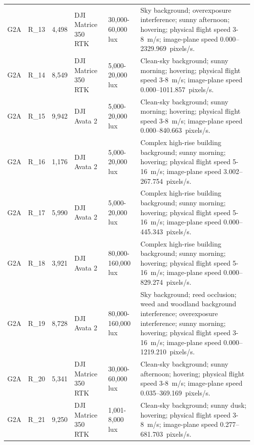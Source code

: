 \begin{longtable}{@{}C{0.045\textwidth} C{0.083\textwidth} C{0.075\textwidth} C{0.13\textwidth} C{0.15\textwidth} L{0.48\textwidth}@{}}
G2A & R\_13 & 4,498 & DJI Matrice 350 RTK & 30,000-60,000 lux & Sky background; overexposure interference; sunny afternoon; hovering; physical flight speed 3-8~m/s; image-plane speed 0.000--2329.969~pixels/s. \\

G2A & R\_14 & 8,549 & DJI Matrice 350 RTK & 5,000-20,000 lux & Clean-sky background; sunny morning; hovering; physical flight speed 3-8~m/s; image-plane speed 0.000--1011.857~pixels/s. \\

G2A & R\_15 & 9,942 & DJI Avata 2 & 5,000-20,000 lux & Clean-sky background; sunny morning; hovering; physical flight speed 3-8~m/s; image-plane speed 0.000--840.663~pixels/s. \\

G2A & R\_16 & 1,176 & DJI Avata 2 & 5,000-20,000 lux & Complex high-rise building background; sunny morning; hovering; physical flight speed 5-16~m/s; image-plane speed 3.002--267.754~pixels/s. \\

G2A & R\_17 & 5,990 & DJI Avata 2 & 5,000-20,000 lux & Complex high-rise building background; sunny morning; hovering; physical flight speed 5-16~m/s; image-plane speed 0.000--445.343~pixels/s. \\

G2A & R\_18 & 3,921 & DJI Avata 2 & 80,000-160,000 lux & Complex high-rise building background; sunny morning; hovering; physical flight speed 5-16~m/s; image-plane speed 0.000--829.274~pixels/s. \\

G2A & R\_19 & 8,728 & DJI Avata 2 & 80,000-160,000 lux & Sky background; reed occlusion; weed and woodland background interference; overexposure interference; sunny morning; hovering; physical flight speed 3-16~m/s; image-plane speed 0.000--1219.210~pixels/s. \\

G2A & R\_20 & 5,341 & DJI Matrice 350 RTK & 30,000-60,000 lux & Clean-sky background; sunny afternoon; hovering; physical flight speed 3-8~m/s; image-plane speed 0.035--369.169~pixels/s. \\

G2A & R\_21 & 9,250 & DJI Matrice 350 RTK & 1,001-8,000 lux & Clean-sky background; sunny dusk; hovering; physical flight speed 3-8~m/s; image-plane speed 0.277--681.703~pixels/s. \\


\end{longtable}
